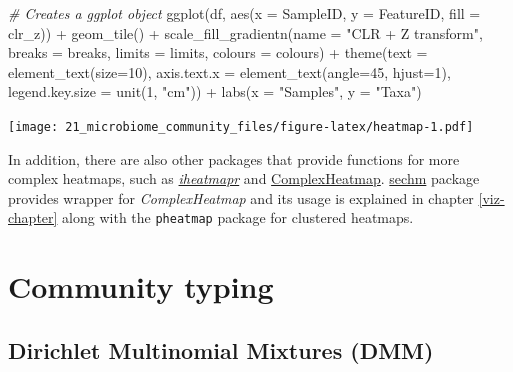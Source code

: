 \documentclass[
]{book}
\newenvironment{Shaded}{\begin{snugshade}}{\end{snugshade}}
\newcommand{\AttributeTok}[1]{\textcolor[rgb]{0.77,0.63,0.00}{#1}}
\newcommand{\CommentTok}[1]{\textcolor[rgb]{0.56,0.35,0.01}{\textit{#1}}}
\newcommand{\DecValTok}[1]{\textcolor[rgb]{0.00,0.00,0.81}{#1}}
\newcommand{\FunctionTok}[1]{\textcolor[rgb]{0.00,0.00,0.00}{#1}}
\newcommand{\NormalTok}[1]{#1}
\newcommand{\SpecialCharTok}[1]{\textcolor[rgb]{0.00,0.00,0.00}{#1}}
\newcommand{\StringTok}[1]{\textcolor[rgb]{0.31,0.60,0.02}{#1}}
\begin{document}
\begin{Shaded}
\begin{Highlighting}[]
\CommentTok{\# Creates a ggplot object}
\FunctionTok{ggplot}\NormalTok{(df, }\FunctionTok{aes}\NormalTok{(}\AttributeTok{x =}\NormalTok{ SampleID, }\AttributeTok{y =}\NormalTok{ FeatureID, }\AttributeTok{fill =}\NormalTok{ clr\_z)) }\SpecialCharTok{+}
  \FunctionTok{geom\_tile}\NormalTok{() }\SpecialCharTok{+}
  \FunctionTok{scale\_fill\_gradientn}\NormalTok{(}\AttributeTok{name =} \StringTok{"CLR + Z transform"}\NormalTok{, }
                       \AttributeTok{breaks =}\NormalTok{ breaks, }\AttributeTok{limits =}\NormalTok{ limits, }\AttributeTok{colours =}\NormalTok{ colours) }\SpecialCharTok{+} 
  \FunctionTok{theme}\NormalTok{(}\AttributeTok{text =} \FunctionTok{element\_text}\NormalTok{(}\AttributeTok{size=}\DecValTok{10}\NormalTok{),}
        \AttributeTok{axis.text.x =} \FunctionTok{element\_text}\NormalTok{(}\AttributeTok{angle=}\DecValTok{45}\NormalTok{, }\AttributeTok{hjust=}\DecValTok{1}\NormalTok{),}
        \AttributeTok{legend.key.size =} \FunctionTok{unit}\NormalTok{(}\DecValTok{1}\NormalTok{, }\StringTok{"cm"}\NormalTok{)) }\SpecialCharTok{+}
  \FunctionTok{labs}\NormalTok{(}\AttributeTok{x =} \StringTok{"Samples"}\NormalTok{, }\AttributeTok{y =} \StringTok{"Taxa"}\NormalTok{)}
\end{Highlighting}
\end{Shaded}

\texttt{[image: 21\_microbiome\_community\_files/figure-latex/heatmap-1.pdf]}

In addition, there are also other packages that provide functions for more complex heatmaps,
such as \href{https://docs.ropensci.org/iheatmapr/articles/full_vignettes/iheatmapr.html}{\emph{iheatmapr}}
and \href{https://academic.oup.com/bioinformatics/article/32/18/2847/1743594?login=true}{ComplexHeatmap}.
\href{http://www.bioconductor.org/packages/release/bioc/vignettes/sechm/inst/doc/sechm.html}{sechm}
package provides wrapper for \emph{ComplexHeatmap} and its usage is explained in chapter \ref{viz-chapter}
along with the \texttt{pheatmap} package for clustered heatmaps.

\hypertarget{community-typing}{%
\chapter{Community typing}\label{community-typing}}

\hypertarget{dirichlet-multinomial-mixtures-dmm}{%
\section{Dirichlet Multinomial Mixtures (DMM)}\label{dirichlet-multinomial-mixtures-dmm}}
\end{document}
